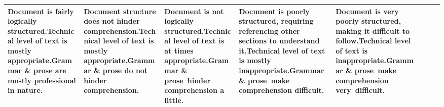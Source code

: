 \documentclass{csse4400}
\begin{document}
\begin{landscape}
\begin{xltabular}{\linewidth}{| p{1.7cm} | X | X | p{34mm} | X | X | X | X |}
Document is fairly logically structured.\newline\newline\newline\newline Technical level of text is mostly appropriate.\newline\newline Grammar \& prose are mostly professional in nature. &
Document structure does not hinder comprehension.\newline\newline\newline Technical level of text is mostly appropriate.\newline\newline Grammar \& prose do not hinder comprehension. &
Document is not logically structured.\newline\newline\newline\newline Technical level of text is at times appropriate.\newline\newline Grammar \& prose~hinder comprehension a little. &
Document is poorly structured, requiring referencing other sections to understand it.\newline\newline Technical level of text is mostly inappropriate.\newline\newline Grammar \& prose~make comprehension difficult. &
Document is very poorly structured, making it difficult to follow.\newline\newline\newline Technical level of text is inappropriate.\newline\newline Grammar \& prose~make comprehension very~difficult. \\
\hline
\end{xltabular}

\end{landscape}
\restoregeometry
\end{document}
